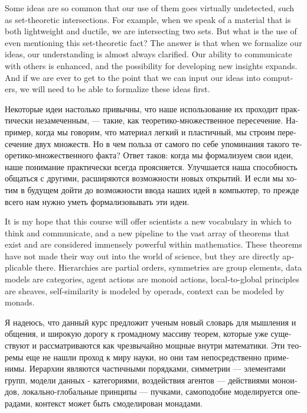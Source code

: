 \documentclass{book}
\theoremstyle{theoremENG}
\theoremstyle{lemmaENG}
\theoremstyle{propositionENG}
\theoremstyle{corollaryENG}
\theoremstyle{factENG}
\theoremstyle{remarkENG}
\theoremstyle{exampleENG}
\theoremstyle{warningENG}
\theoremstyle{questionENG}
\theoremstyle{guessENG}
\theoremstyle{answerENG}
\theoremstyle{constructionENG}
\theoremstyle{rulesENG}
\theoremstyle{excENG}
\theoremstyle{appENG}
\theoremstyle{definitionENG}
\theoremstyle{notationENG}
\theoremstyle{conjectureENG}
\theoremstyle{postulateENG}
\theoremstyle{theoremRUS}
\theoremstyle{lemmaRUS}
\theoremstyle{propositionRUS}
\theoremstyle{corollaryRUS}
\theoremstyle{factRUS}
\theoremstyle{remarkRUS}
\theoremstyle{exampleRUS}
\theoremstyle{warningRUS}
\theoremstyle{questionRUS}
\theoremstyle{guessRUS}
\theoremstyle{answerRUS}
\theoremstyle{constructionRUS}
\theoremstyle{rulesRUS}
\theoremstyle{excRUS}
\theoremstyle{appRUS}
\theoremstyle{definitionRUS}
\theoremstyle{notationRUS}
\theoremstyle{conjectureRUS}
\theoremstyle{postulateRUS}
\begin{document}
\begin{english}
Some ideas are so common that our use of them goes virtually undetected, such as set-theoretic intersections. For example, when we speak of a material that is both lightweight and ductile, we are intersecting two sets. But what is the use of even mentioning this set-theoretic fact? The answer is that when we formalize our ideas, our understanding is almost always clarified. Our ability to communicate with others is enhanced, and the possibility for developing new insights expands. And if we are ever to get to the point that we can input our ideas into computers, we will need to be able to formalize these ideas first.

\begin{russian}Некоторые идеи настолько привычны, что наше использование их проходит практически незамеченным, — такие, как теоретико-множественное пересечение. Например, когда мы говорим, что материал легкий и пластичный, мы строим пересечение двух множеств. Но в чем польза от самого по себе упоминания такого теоретико-множественного факта? Ответ таков: когда мы формализуем свои идеи, наше понимание практически всегда проясняется. Улучшается наша способность общаться с другими, расширяются возможности новых открытий. И если мы хотим в будущем дойти до возможности ввода наших идей в компьютер, то прежде всего нам нужно уметь формализовывать эти идеи. \end{russian}

It is my hope that this course will offer scientists a new vocabulary in which to think and communicate, and a new pipeline to the vast array of theorems that exist and are considered immensely powerful within mathematics. These theorems have not made their way out into the world of science, but they are directly applicable there. Hierarchies are partial orders, symmetries are group elements, data models are categories, agent actions are monoid actions, local-to-global principles are sheaves, self-similarity is modeled by operads, context can be modeled by monads.

\begin{russian}Я надеюсь, что данный курс предложит ученым новый словарь для мышления и общения, и широкую дорогу к громадному массиву теорем, которые уже существуют и рассматриваются как чрезвычайно мощные внутри математики. Эти теоремы еще не нашли проход к миру науки, но они там непосредственно применимы. Иерархии являются частичными порядками, симметрии — элементами групп, модели данных - категориями, воздействия агентов — действиями моноидов, локально-глобальные принципы — пучками, самоподобие моделируется операдами, контекст может быть смоделирован монадами. \end{russian}


\end{english}
\end{document}
